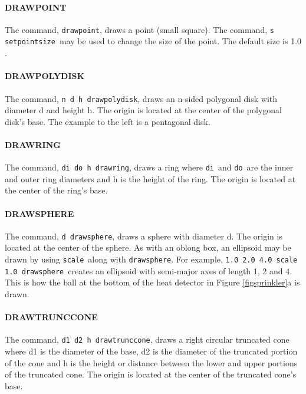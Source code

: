 \documentclass[11pt,twoside]{book}
\begin{document}
\paragraph{DRAWPOINT} The command, {\tt drawpoint}, draws a point
(small square).  The command, {\tt s setpointsize}\ may be used to
change the size of the point.  The default size is 1.0 .

\paragraph{DRAWPOLYDISK} The command, {\tt n d h drawpolydisk},
draws an n-sided polygonal disk with diameter d and height h.  The
origin is located at the center of the polygonal disk's base.  The
example to the left is a pentagonal disk.

\paragraph{DRAWRING} The command, {\tt di do h drawring},
draws a ring where {\tt di}\ and {\tt do}\ are the inner and outer
ring diameters and h is the height of the ring. The origin is
located at the center of the ring's base.

\paragraph{DRAWSPHERE} The command, {\tt d drawsphere},
draws a sphere with diameter d.  The origin is located at the
center of the sphere. As with an oblong box, an ellipsoid may be
drawn by using {\tt scale}\ along with {\tt drawsphere}. For
example, {\tt 1.0 2.0 4.0 scale 1.0 drawsphere}\ creates an
ellipsoid with semi-major axes of length 1, 2 and 4. This is how
the ball at the bottom of the heat detector in Figure \ref{figsprinkler}a is drawn.

\paragraph{DRAWTRUNCCONE} The command, {\tt d1 d2 h drawtrunccone},
draws a right circular truncated cone where d1 is the diameter of
the base, d2 is the diameter of the truncated portion of the cone
and h is the height or distance between the lower and upper
portions of the truncated cone.  The origin is located at the
center of the truncated cone's base.
\end{document}
